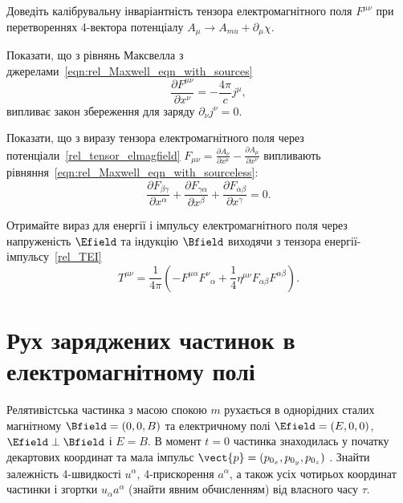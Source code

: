 \begin{problem}
Доведіть калібрувальну інваріантність тензора електромагнітного поля $F^{\mu\nu}$ при перетвореннях
4-вектора потенціалу $A_{\mu} \rightarrow A_{mu}+\partial_{\mu} \chi$.
\end{problem}

\begin{problem}
Показати, що з рівнянь Максвелла з джерелами~\eqref{eqn:rel_Maxwell_eqn_with_sources}
\[
	\frac{\partial F^{\mu\nu}}{\partial x^\nu} = -\frac{4\pi}{c}j^\mu,
\]
випливає закон збереження для заряду $\partial_\nu j^{\nu} = 0$.
\end{problem}

\begin{problem}
Показати, що з виразу тензора електромагнітного поля через потенціали~\eqref{rel_tensor_elmagfield} $F_{\mu\nu} = \frac{\partial A_\nu}{\partial  x^\mu} - \frac{\partial A_\mu}{\partial  x^\nu}$ випливають рівняння~\eqref{eqn:rel_Maxwell_eqn_with_sourceless}:
\[
    \frac{\partial F_{\beta\gamma}}{\partial x^\alpha} + \frac{\partial F_{\gamma\alpha}}{\partial x^\beta} +\frac{\partial
				F_{\alpha\beta}}{\partial x^\gamma}  = 0.
\]
\end{problem}


\begin{problem}
Отримайте вираз для енергії і імпульсу електромагнітного поля через напруженість $\Efield$ та індукцію $\Bfield$ виходячи з тензора енергії-імпульсу~\eqref{rel_TEI}
\[
	T^{\mu\nu} = \frac{1}{4\pi}\left( -F^{\mu \alpha}F^\nu_{\;\;\alpha} + \frac14\eta^{\mu\nu}F_{\alpha\beta}F^{\alpha\beta}\right).
\]
\end{problem}

\section{Рух заряджених частинок в електромагнітному полі}

\begin{problem}
Релятивістська частинка з масою спокою $m$ рухається в однорідних сталих  магнітному  $\Bfield = (0,0,B)$ та електричному полі $\Efield = (E,0,0)$, $\Efield\perp\Bfield$  і $E = B$. В момент $t=0$ частинка знаходилась у початку декартових координат та мала імпульс $\vect{p} = (p_{0_x}, p_{0_y}, p_{0_z})$ . Знайти залежність 4-швидкості $u^{\alpha}$, 4-прискорення $a^{\alpha}$, а також усіх чотирьох координат частинки і згортки $u_{\alpha}a^{\alpha}$  (знайти явним обчисленням) від власного часу $\tau$.
\end{problem}

